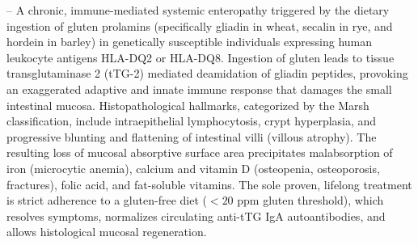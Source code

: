 -- A chronic, immune-mediated systemic enteropathy triggered by the dietary ingestion of gluten prolamins (specifically gliadin in wheat, secalin in rye, and hordein in barley) in genetically susceptible individuals expressing human leukocyte antigens HLA-DQ2 or HLA-DQ8. Ingestion of gluten leads to tissue transglutaminase 2 (tTG-2) mediated deamidation of gliadin peptides, provoking an exaggerated adaptive and innate immune response that damages the small intestinal mucosa. Histopathological hallmarks, categorized by the Marsh classification, include intraepithelial lymphocytosis, crypt hyperplasia, and progressive blunting and flattening of intestinal villi (villous atrophy). The resulting loss of mucosal absorptive surface area precipitates malabsorption of iron (microcytic anemia), calcium and vitamin D (osteopenia, osteoporosis, fractures), folic acid, and fat-soluble vitamins. The sole proven, lifelong treatment is strict adherence to a gluten-free diet ($<20\text{ ppm}$ gluten threshold), which resolves symptoms, normalizes circulating anti-tTG IgA autoantibodies, and allows histological mucosal regeneration.

